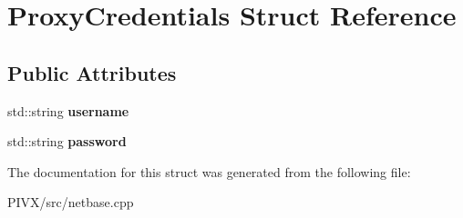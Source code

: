 \hypertarget{struct_proxy_credentials}{}\section{Proxy\+Credentials Struct Reference}
\label{struct_proxy_credentials}
\subsection*{Public Attributes}
\begin{DoxyCompactItemize}
\item 
\mbox{\label{struct_proxy_credentials_a1b5e426884ddec6a55c60561c1e85c6a}} 
std\+::string {\bfseries username}
\item 
\mbox{\label{struct_proxy_credentials_a380630fa3a709e51f7a692e757c876d7}} 
std\+::string {\bfseries password}
\end{DoxyCompactItemize}


The documentation for this struct was generated from the following file\+:\begin{DoxyCompactItemize}
\item 
P\+I\+V\+X/src/netbase.\+cpp\end{DoxyCompactItemize}
